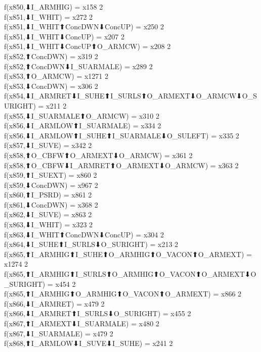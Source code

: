 f(x850,⬇I_ARMHIG) = x158 {2} \\
f(x851,⬇I_WHIT) = x272 {2} \\
f(x851,⬇I_WHIT⬆ConcDWN⬇ConcUP) = x250 {2} \\
f(x851,⬇I_WHIT⬇ConcUP) = x207 {2} \\
f(x851,⬇I_WHIT⬇ConcUP⬆O_ARMCW) = x208 {2} \\
f(x852,⬆ConcDWN) = x319 {2} \\
f(x852,⬆ConcDWN⬇I_SUARMALE) = x289 {2} \\
f(x853,⬆O_ARMCW) = x1271 {2} \\
f(x853,⬇ConcDWN) = x306 {2} \\
f(x854,⬇I_ARMRET⬇I_SUHE⬆I_SURLS⬆O_ARMEXT⬇O_ARMCW⬇O_SURIGHT) = x211 {2} \\
f(x855,⬇I_SUARMALE⬆O_ARMCW) = x310 {2} \\
f(x856,⬇I_ARMLOW⬆I_SUARMALE) = x334 {2} \\
f(x856,⬇I_ARMLOW⬆I_SUHE⬆I_SUARMALE⬇O_SULEFT) = x335 {2} \\
f(x857,⬇I_SUVE) = x342 {2} \\
f(x858,⬆O_CBFW⬆O_ARMEXT⬇O_ARMCW) = x361 {2} \\
f(x858,⬆O_CBFW⬇I_ARMRET⬆O_ARMEXT⬇O_ARMCW) = x363 {2} \\
f(x859,⬆I_SUEXT) = x860 {2} \\
f(x859,⬇ConcDWN) = x967 {2} \\
f(x860,⬆I_PSRD) = x861 {2} \\
f(x861,⬇ConcDWN) = x368 {2} \\
f(x862,⬇I_SUVE) = x863 {2} \\
f(x863,⬇I_WHIT) = x323 {2} \\
f(x863,⬇I_WHIT⬆ConcDWN⬇ConcUP) = x304 {2} \\
f(x864,⬇I_SUHE⬆I_SURLS⬇O_SURIGHT) = x213 {2} \\
f(x865,⬆I_ARMHIG⬆I_SUHE⬆O_ARMHIG⬆O_VACON⬆O_ARMEXT) = x1274 {2} \\
f(x865,⬆I_ARMHIG⬆I_SURLS⬆O_ARMHIG⬆O_VACON⬆O_ARMEXT⬇O_SURIGHT) = x454 {2} \\
f(x865,⬆I_ARMHIG⬆O_ARMHIG⬆O_VACON⬆O_ARMEXT) = x866 {2} \\
f(x866,⬇I_ARMRET) = x479 {2} \\
f(x866,⬇I_ARMRET⬆I_SURLS⬇O_SURIGHT) = x455 {2} \\
f(x867,⬆I_ARMEXT⬇I_SUARMALE) = x480 {2} \\
f(x867,⬇I_SUARMALE) = x479 {2} \\
f(x868,⬆I_ARMLOW⬇I_SUVE⬇I_SUHE) = x241 {2} \\
